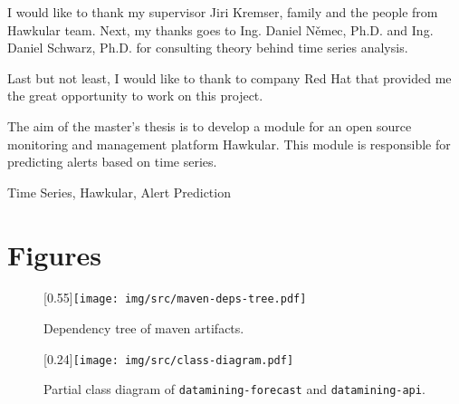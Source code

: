\documentclass[12pt,oneside]{fithesis2}
\begin{document}
\FrontMatter                    %
\ThesisTitlePage                %
\begin{ThesisDeclaration}       %
  \DeclarationText
  \AdvisorName
\end{ThesisDeclaration}

\begin{ThesisThanks}            %
  I would like to thank my supervisor Jiri Kremser, family and 
  the people from Hawkular team. Next, my thanks goes to Ing. Daniel Němec, Ph.D. and
  Ing. Daniel Schwarz, Ph.D. for consulting theory behind time series analysis. 

  Last but not least, I would like to thank to company Red Hat that provided me 
  the great opportunity to work on this project.
\end{ThesisThanks}

\begin{ThesisAbstract}          %
  The aim of the master's thesis is to develop a module for an open source monitoring
  and management platform Hawkular. This module is responsible for predicting
  alerts based on time series. 
\end{ThesisAbstract}

\begin{ThesisKeyWords}          %
  Time Series, Hawkular, Alert Prediction
\end{ThesisKeyWords}

\tableofcontents                %

\MainMatter                     %

    

\appendix
\chapter{Figures}
\begin{figure}[H]
    \begin{center}
        \scalebox{0.36}[0.55]{\texttt{[image: img/src/maven-deps-tree.pdf]}}
        \caption{Dependency tree of maven artifacts.}
        \label{appen:maven-deps}
    \end{center}
\end{figure}

\begin{figure}[H]
    \begin{center}
        \scalebox{0.4}[0.24]{\texttt{[image: img/src/class-diagram.pdf]}}
        \caption{Partial class diagram of \texttt{datamining-forecast} and \texttt{datamining-api}.}
        \label{appen:class-diagram}
    \end{center}
\end{figure}
\end{document}
